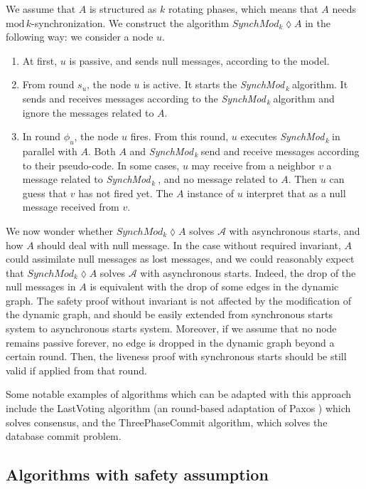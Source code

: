 \documentclass[11pt,letterpaper]{article}
\newcommand{\tf}{\phi}
\newcommand{\SM}{{\em SynchMod}$_{\,k}\ $}
\begin{document}
We assume that $A$ is structured as $k$ rotating phases, which means that $A$ needs $\mathrm{mod}\,k$-synchronization.
We construct the algorithm $SynchMod_k \lozenge A$ in the following way:
we consider a node $u$. 
\begin{enumerate}
	\item At first, $u$ is passive, and sends null messages, according to the model.
	\item From round $s_u$, the node $u$ is active. It starts the \SM algorithm. It sends and receives messages according to the \SM algorithm and ignore the messages related to $A$.
	\item In round $\tf_u$, the node $u$ fires. From this round, $u$ executes \SM in parallel with $A$. Both $A$ and \SM send and receive messages according to their pseudo-code.
		In some cases, $u$ may receive from a neighbor $v$ a message related to \SM, and no message related to $A$. Then $u$ can guess that $v$ has not fired yet.
		The $A$ instance of $u$ interpret that as a null message received from $v$.
\end{enumerate}

We now wonder whether $SynchMod_k \lozenge A$ solves $\mathcal{A}$ with asynchronous starts, and how $A$ should deal with null message.
In the case without required invariant, $A$ could assimilate null messages as lost messages,
and we could reasonably expect that $SynchMod_k \lozenge A$ solves $\mathcal{A}$ with asynchronous starts.
Indeed, the drop of the null messages in $A$ is equivalent with the drop of some edges in the dynamic graph.
The safety proof without invariant is not affected by the modification of the dynamic graph, and should be easily extended from synchronous starts system to asynchronous starts system.
Moreover, if we assume that no node remains passive forever, no edge is dropped in the dynamic graph beyond a certain round.
Then, the liveness proof with synchronous starts should be still valid if applied from that round.

Some notable examples of algorithms which can be adapted with this approach include the LastVoting \cite{CBS09} algorithm (an round-based adaptation of Paxos \cite{paxos}) which solves consensus,
and the ThreePhaseCommit \cite{BT93} algorithm, which solves the database commit problem.

\subsection{Algorithms with safety assumption}
\end{document}

